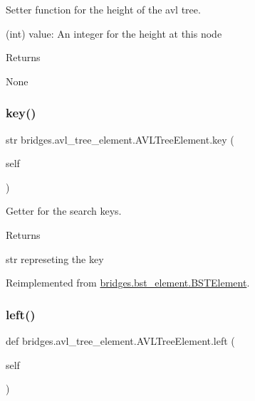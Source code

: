 Setter function for the height of the avl tree. 

\begin{DoxyVerb}       (int) value: An integer for the height at this node
\end{DoxyVerb}
 \begin{DoxyReturn}{Returns}


None 
\end{DoxyReturn}
\mbox{\label{classbridges_1_1avl__tree__element_1_1_a_v_l_tree_element_ac830bbf88d156574fd23a8b1eaa6bc69}} 
\subsubsection{\texorpdfstring{key()}{key()}}
{\footnotesize\ttfamily  str bridges.\+avl\+\_\+tree\+\_\+element.\+A\+V\+L\+Tree\+Element.\+key (\begin{DoxyParamCaption}\item[{}]{self }\end{DoxyParamCaption})}



Getter for the search keys. 

\begin{DoxyReturn}{Returns}


str represeting the key 
\end{DoxyReturn}


Reimplemented from \mbox{\hyperlink{classbridges_1_1bst__element_1_1_b_s_t_element_ae911a11782ad4623b21781c5eeeb7d39}{bridges.\+bst\+\_\+element.\+B\+S\+T\+Element}}.

\mbox{\label{classbridges_1_1avl__tree__element_1_1_a_v_l_tree_element_a717696b26736f5c9585fefc7c5ab88f1}} 
\subsubsection{\texorpdfstring{left()}{left()}\hspace{0.1cm}{\footnotesize\ttfamily [1/2]}}
{\footnotesize\ttfamily def bridges.\+avl\+\_\+tree\+\_\+element.\+A\+V\+L\+Tree\+Element.\+left (\begin{DoxyParamCaption}\item[{}]{self }\end{DoxyParamCaption})}



